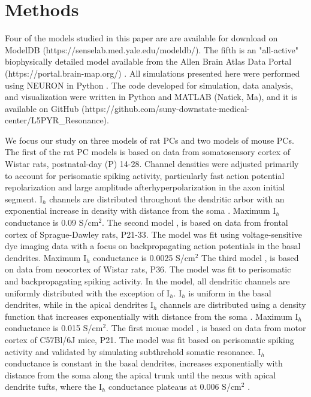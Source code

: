 \documentclass[utf8]{frontiersSCNS} %
\begin{document}
\section{Methods}
Four of the models studied in this paper \citep{Kole2008-aj, Acker2009-yj, Hay2011-if, Neymotin2017-dr} are
are available for download on ModelDB (https://senselab.med.yale.edu/modeldb/).  The fifth is an "all-active"
biophysically detailed model available from the Allen Brain Atlas Data Portal (https://portal.brain-map.org/) \citep{Reimann2013-mg, Markram2015-zg}.
All simulations presented here were performed using NEURON in Python \citep{Hines2009-qx}.  The code 
developed for simulation, data analysis, and visualization were written in Python and MATLAB (Natick, Ma), and it
is available on GitHub (https://github.com/suny-downstate-medical-center/L5PYR\_Resonance).

We focus our study on three models of rat PCs and two models of mouse PCs.  The first of the rat PC models \citep{Kole2008-aj} 
is based on data from somatosensory cortex of Wistar rats, postnatal-day (P) 14-28. Channel densities were adjusted 
primarily to account for perisomatic spiking activity, particularly fast action potential repolarization and 
large amplitude  afterhyperpolarization in the axon initial segment.  I$_h$ channels are distributed throughout 
the dendritic arbor with an exponential increase in density with distance from the soma \citep{Kole2006-bm}. Maximum
I$_h$ conductance is 0.09 S/cm$^2$. The second model \citep{Acker2009-yj}, is based on data from frontal cortex of 
Sprague-Dawley rats, P21-33.  The model was fit using voltage-sensitive dye imaging data with a focus on 
backpropagating action potentials in the basal dendrites. Maximum I$_h$ conductance is 0.0025 S/cm$^2$ The third
model \citep{Hay2011-if}, is based on data from neocortex of Wistar rats, P36.  The model was fit to perisomatic
and backpropagating spiking activity.  In the model, all dendritic channels are uniformly distributed with the 
exception of I$_h$.  I$_h$ is uniform in the basal dendrites, while in the apical dendrites I$_h$ channels are
distributed using a density function that increases exponentially with distance from the soma 
\citep{Nevian2007-gw, Kole2006-bm}.  Maximum I$_h$ conductance is 0.015 S/cm$^2$.  The first mouse model \citep{Neymotin2017-dr},
is based on data from  motor cortex of C57Bl/6J mice, P21.  The model was fit based on perisomatic spiking activity and
validated by simulating subthrehold somatic resonance.  I$_h$ conductance is constant in the basal dendrites, increases
exponentially with distance from the soma along the apical trunk until the nexus with apical dendrite tufts, where
the I$_h$ conductance plateaus at 0.006 S/cm$^2$ \citep{Harnett2015-s}.  
\end{document}
